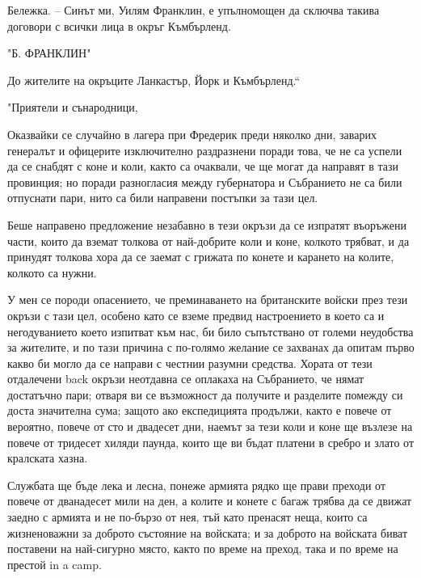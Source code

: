 \documentclass[12pt]{book}
\begin{document}
Бележка. -- Синът ми, Уилям Франклин, е упълномощен да сключва такива договори с всички лица в окръг Къмбърленд.

                                        "Б. ФРАНКЛИН"

До жителите на окръците Ланкастър, 
    Йорк и Къмбърленд.“

"Приятели и сънародници,

Оказвайки се случайно в лагера при Фредерик преди няколко дни, заварих генералът и офицерите изключително раздразнени поради това, че не са успели да се снабдят с коне и коли, както са очаквали, че ще могат да направят в тази провинция; но поради разногласия между губернатора и Събранието не са били отпуснати пари, нито са били направени постъпки за тази цел.

Беше направено предложение незабавно в тези окръзи да се изпратят въоръжени части, които да вземат толкова от най-добрите коли и коне, колкото трябват, и да принудят толкова хора да се заемат с грижата по конете и карането на колите, колкото са нужни.

У мен се породи опасението, че преминаването на британските войски през тези окръзи с тази цел, особено като се вземе предвид настроението в което са и негодуванието което изпитват към нас, би било съпътствано от големи неудобства за жителите, и по тази причина с по-голямо желание се захванах да опитам първо какво би могло да се направи с честнии разумни средства. Хората от тези отдалечени back окръзи неотдавна се оплакаха на Събранието, че нямат достатъчно пари; отваря ви се възможност да получите и разделите помежду си доста значителна сума; защото ако експедицията продължи, както е повече от вероятно, повече от сто и двадесет дни, наемът за тези коли и коне ще възлезе на повече от тридесет хиляди паунда, които ще ви бъдат платени в сребро и злато от кралската хазна.

Службата ще бъде лека и лесна, понеже армията рядко ще прави преходи от повече от дванадесет мили на ден, а колите и конете с багаж трябва да се движат заедно с армията и не по-бързо от нея, тъй като пренасят неща, които са жизненоважни за доброто състояние на войската; и за доброто на войската биват поставени на най-сигурно място, както по време на преход, така и по време на престой in a camp. 
\end{document}

